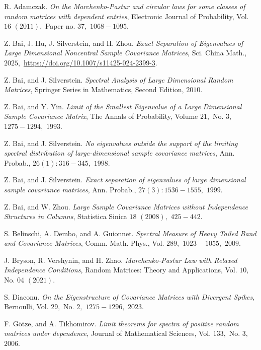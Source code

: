 \documentclass{article}
\numberwithin{equation}{section}
\begin{document}
 
\begin{thebibliography}{}

    R. Adamczak. \textit{On the Marchenko-Pastur and circular laws for some classes of random matrices with dependent entries}, Electronic Journal of Probability, Vol. \(16\) \((2011),\) Paper no. \(37,\) \(1068-1095.\)

     Z. Bai, J. Hu, J. Silverstein, and H. Zhou. \textit{Exact Separation of Eigenvalues of Large Dimensional Noncentral Sample Covariance Matrices}, Sci. China Math., \(2025,\) \url{https://doi.org/10.1007/s11425-024-2399-3}.

    Z. Bai, and J. Silverstein. \textit{Spectral Analysis of Large Dimensional Random Matrices}, Springer Series in Mathematics, Second Edition, \(2010.\)

     Z. Bai, and Y. Yin. \textit{Limit of the Smallest Eigenvalue of a Large Dimensional Sample Covariance Matrix}, The Annals of Probability, Volume \(21,\) No. \(3,\) \(1275-1294,\) \(1993.\)
    
     Z. Bai, and J. Silverstein. \textit{No eigenvalues outside the support of the limiting spectral distribution of large-dimensional sample covariance matrices}, Ann. Probab., \(26(1):316-345,\) \(1998.\)

      Z. Bai, and J. Silverstein. \textit{Exact separation of eigenvalues of large dimensional sample covariance matrices}, Ann. Probab., \(27(3):1536-1555,\) \(1999.\)

    Z. Bai, and W. Zhou. \textit{Large Sample Covariance Matrices without Independence Structures in Columns}, Statistica Sinica \(18\) \((2008),\) \(425-442.\)

     S. Belinschi, A. Dembo, and A. Guionnet. \textit{Spectral Measure of Heavy Tailed Band and Covariance Matrices}, Comm. Math. Phys., Vol. \(289,\) \(1023-1055,\) \(2009.\)

     J. Bryson, R. Vershynin, and H. Zhao. \textit{Marchenko-Pastur Law with Relaxed Independence Conditions}, Random Matrices: Theory and Applications, Vol. \(10,\) No. \(04\) \((2021).\)

     S. Diaconu. \textit{On the Eigenstructure of Covariance Matrices with Divergent Spikes}, Bernoulli, Vol. \(29,\) No. \(2,\) \(1275-1296,\) \(2023.\)

     F. Götze, and A. Tikhomirov. \textit{Limit theorems for spectra of positive random matrices under dependence}, Journal of Mathematical Sciences, Vol. \(133,\) No. \(3,\) \(2006.\)


\end{thebibliography}
\end{document}
